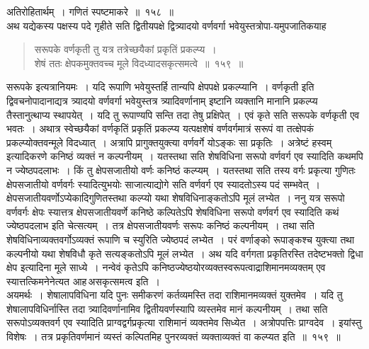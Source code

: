 \documentclass[11pt, openany]{book}
\begin{document}
 अतिरोहितार्थम्~। गणितं स्पष्टमाकरे~॥~१५८~॥\\

\vspace{-2mm}
 अथ यद्येकस्य पक्षस्य पदे गृहीते सति द्वितीयपक्षे द्वित्र्यादयो
वर्णवर्गा भवेयुस्तत्रोपा-यमुपजातिकयाह\textendash
\begin{quote}
    \ab 
      सरूपके वर्णकृती तु यत्र तत्रेच्छयैकां प्रकृतिं प्रकल्प्य~।\\
 शेषं ततः क्षेपकमुक्तवच्च मूले विदध्यादसकृत्समत्वे~॥~१५९~॥

\end{quote}

सरूपके इत्यत्रानियमः~। यदि रूपाणि भवेयुस्तर्हि तान्यपि क्षेपपक्षे
प्रकल्प्यानि~। वर्णकृती इति द्विवचनोपादानाद्यत्र त्र्यादयो वर्णवर्गा
भवेयुस्तत्र
त्र्यादिवर्णानाम् इष्टानि व्यक्तानि मानानि प्रकल्प्य तैस्तानुत्थाप्य
स्थापयेत्~। यदि
तु रूपाण्यपि सन्ति तदा तेषु प्रक्षिपेत्~। एवं कृते सति सरूपके वर्णकृती
एव भवतः~। अथात्र स्वेच्छयैकां वर्णकृतिं प्रकृतिं प्रकल्प्य यत्पक्षशेषं
वर्णवर्गमात्रं
सरूपं वा तत्क्षेपकं प्रकल्प्योक्तवन्मूले विदध्यात्~। अत्रापि प्रागुक्तयुक्त्या वर्णवर्गे
योऽङ्कः सा प्रकृतिः~। अत्रेष्टं हस्वम् इत्यादिकरणे कनिष्ठं व्यक्तं न
कल्पनीयम्~।
यतस्तथा सति शेषविधिना सरूपो वर्णवर्ग एव स्यादिति कथमपि न
ज्येष्ठपदलाभः~।
किं तु क्षेपसजातीयो वर्णः कनिष्ठं कल्प्यम्~। यतस्तथा सति तस्य वर्गः
प्रकृत्या गुणितः क्षेपसजातीयो वर्णवर्गः स्यादित्युभयोः साजात्याद्योगे
सति
वर्णवर्ग एव स्यादतोऽस्य पदं सम्भवेत्~। क्षेपसजातीयवर्णोऽप्येकादिगुणितस्तथा
कल्प्यो यथा शेषविधिनाङ्कतोऽपि मूलं लभ्येत~।
\newpage
ननु यत्र सरूपो वर्णवर्गः क्षेपः स्यात्तत्र क्षेपसजातीयवर्णे कनिष्ठे
कल्पितेऽपि शेषविधिना सरूपो वर्णवर्ग एव स्यादिति कथं ज्येष्ठपदलाभ इति
चेत्सत्यम्~।
 तत्र क्षेपसजातीयवर्णः सरूपः कनिष्ठं कल्पनीयम्~। तथा सति शेषविधिनाव्यक्तवर्गोऽव्यक्तं रूपाणि च स्युरिति ज्येष्ठपदं लभ्येत~। परं
वर्णाङ्को 
रूपाङ्कश्च युक्त्या तथा कल्पनीयो यथा शेषविधौ कृते सत्यङ्कतोऽपि
 मूलं लभ्येत~। अथ यदि वर्गगता प्रकृतिरस्ति तदेष्टभक्तो द्विधा क्षेप
इत्यादिना
 मूले साध्ये~। नन्वेवं कृतेऽपि
कनिष्ठज्येष्ठयोरव्यक्तस्वरूपत्वाद्राशिमानमव्यक्तम् एव
 स्यात्तत्किमनेनेत्यत आह\textendash \,असकृत्समत्व इति~। \\

\vspace{-4mm}
अयमर्थः~। शेषालापविधिना यदि पुनः समीकरणं कर्तव्यमस्ति तदा
 राशिमानमव्यक्तं युक्तमेव~। यदि तु शेषालापविधिर्नास्ति तदा
त्र्यादिवर्णानामिव द्वितीयवर्णस्यापि व्यस्तमेव मानं कल्पनीयम्~। तथा सति सरूपोऽव्यक्तवर्ग
एव स्यादिति प्राग्वद्वर्गप्रकृत्या राशिमानं व्यक्तमेव सिध्येत~।
अत्रोपपत्तिः प्राग्वदेव~।
 इयांस्तु विशेषः~। तत्र प्रकृतिवर्णमानं व्यस्तं कल्पितमिह
पुनरव्यक्तं व्यक्ताव्यक्तं वा कल्प्यत इति~॥~१५९~॥\\
\end{document}
